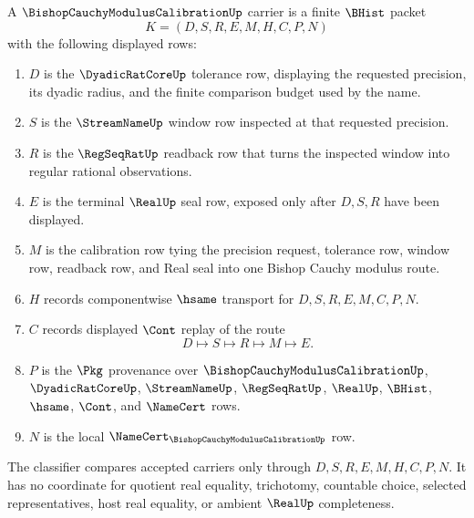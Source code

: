 \begin{definition}
\label{def:bishop-cauchy-modulus-calibration-carrier}
A $\BishopCauchyModulusCalibrationUp$ carrier is a finite $\BHist$ packet
$$
K=(D,S,R,E,M,H,C,P,N)
$$
with the following displayed rows:
\begin{enumerate}
\item $D$ is the $\DyadicRatCoreUp$ tolerance row, displaying the requested precision, its dyadic radius, and the finite comparison budget used by the name.
\item $S$ is the $\StreamNameUp$ window row inspected at that requested precision.
\item $R$ is the $\RegSeqRatUp$ readback row that turns the inspected window into regular rational observations.
\item $E$ is the terminal $\RealUp$ seal row, exposed only after $D,S,R$ have been displayed.
\item $M$ is the calibration row tying the precision request, tolerance row, window row, readback row, and Real seal into one Bishop Cauchy modulus route.
\item $H$ records componentwise $\hsame$ transport for $D,S,R,E,M,C,P,N$.
\item $C$ records displayed $\Cont$ replay of the route
$$
D \longmapsto S \longmapsto R \longmapsto M \longmapsto E .
$$
\item $P$ is the $\Pkg$ provenance over $\BishopCauchyModulusCalibrationUp$, $\DyadicRatCoreUp$, $\StreamNameUp$, $\RegSeqRatUp$, $\RealUp$, $\BHist$, $\hsame$, $\Cont$, and $\NameCert$ rows.
\item $N$ is the local $\NameCert_{\BishopCauchyModulusCalibrationUp}$ row.
\end{enumerate}
The classifier compares accepted carriers only through $D,S,R,E,M,H,C,P,N$. It has no coordinate for quotient real equality, trichotomy, countable choice, selected representatives, host real equality, or ambient $\RealUp$ completeness.
\end{definition}

